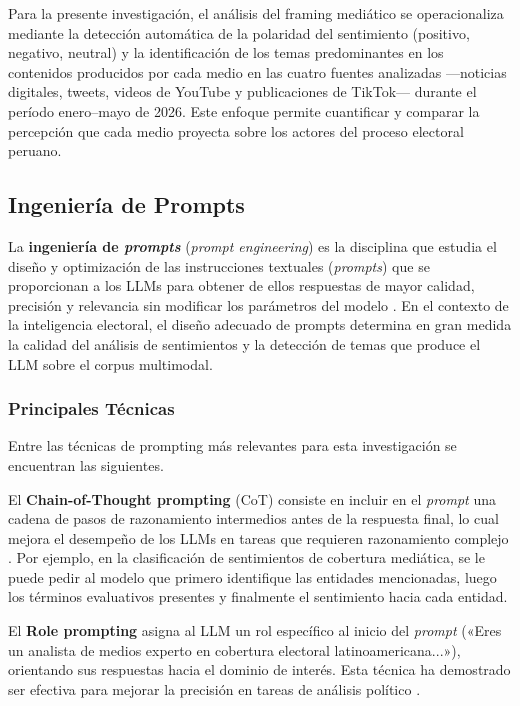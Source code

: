 Para la presente investigación, el análisis del framing mediático se operacionaliza mediante la detección automática de la polaridad del sentimiento (positivo, negativo, neutral) y la identificación de los temas predominantes en los contenidos producidos por cada medio en las cuatro fuentes analizadas —noticias digitales, tweets, videos de YouTube y publicaciones de TikTok— durante el período enero–mayo de 2026. Este enfoque permite cuantificar y comparar la percepción que cada medio proyecta sobre los actores del proceso electoral peruano.

\subsection{Ingeniería de Prompts}

La \textbf{ingeniería de \textit{prompts}} (\textit{prompt engineering}) es la disciplina que estudia el diseño y optimización de las instrucciones textuales (\textit{prompts}) que se proporcionan a los LLMs para obtener de ellos respuestas de mayor calidad, precisión y relevancia sin modificar los parámetros del modelo \parencite{tec_white2023prompt}. En el contexto de la inteligencia electoral, el diseño adecuado de prompts determina en gran medida la calidad del análisis de sentimientos y la detección de temas que produce el LLM sobre el corpus multimodal.

\subsubsection{Principales Técnicas}

Entre las técnicas de prompting más relevantes para esta investigación se encuentran las siguientes.

El \textbf{Chain-of-Thought prompting} (CoT) consiste en incluir en el \textit{prompt} una cadena de pasos de razonamiento intermedios antes de la respuesta final, lo cual mejora el desempeño de los LLMs en tareas que requieren razonamiento complejo \parencite{tec_wei2022cot}. Por ejemplo, en la clasificación de sentimientos de cobertura mediática, se le puede pedir al modelo que primero identifique las entidades mencionadas, luego los términos evaluativos presentes y finalmente el sentimiento hacia cada entidad.

El \textbf{Role prompting} asigna al LLM un rol específico al inicio del \textit{prompt} («Eres un analista de medios experto en cobertura electoral latinoamericana...»), orientando sus respuestas hacia el dominio de interés. Esta técnica ha demostrado ser efectiva para mejorar la precisión en tareas de análisis político \parencite{pr_alvarez2023llm_political}.

